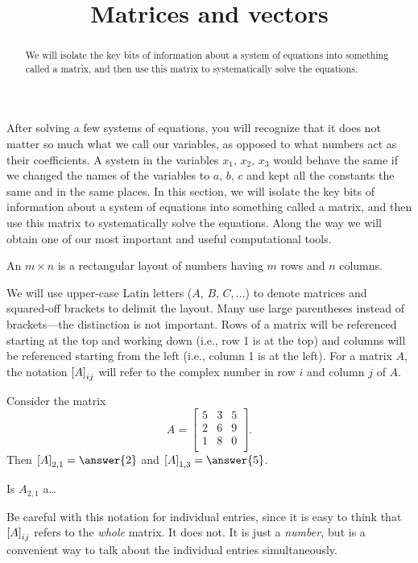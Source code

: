 \documentclass{ximera}
\title{Matrices and vectors}
\begin{document}
\begin{abstract}
  We will isolate the key bits of information about a system of
  equations into something called a matrix, and then use this matrix
  to systematically solve the equations.
\end{abstract}
\maketitle

After solving a few systems of equations, you will recognize that it does not matter so much what we call our variables, as opposed to what numbers act as their coefficients.  A system in the variables $x_1,\,x_2,\,x_3$  would behave the same if we changed the names of the variables to $a,\,b,\,c$ and kept all the constants the same and in the same places.  In this section, we will isolate the key bits of information about a system of equations into something called a matrix, and then use this matrix to systematically solve the equations.  Along the way we will obtain one of our most important and useful computational tools.

\begin{definition}
  An $m\times n$  is a rectangular layout of numbers having $m$ rows and $n$ columns.
\end{definition}

We will use upper-case Latin letters ($A,\,B,\,C,\dotsc$) to denote
matrices and squared-off brackets to delimit the layout.  Many use
large parentheses instead of brackets---the distinction is not
important.  Rows of a matrix will be referenced starting at the top
and working down (i.e., row 1 is at the top) and columns will be
referenced starting from the left (i.e., column 1 is at the left).
For a matrix $A$, the notation $\left\lbrack A\right\rbrack_{ij}$ will refer to the
complex number in row $i$ and column $j$ of $A$.

\begin{exercise}
  Consider the matrix
  \[
    A = \begin{bmatrix}
      5 & 3 & 5 \\
      2 & 6 & 9 \\
      1 & 8 & 0 \\
    \end{bmatrix}.
  \]
  Then $\matrixentry{A}{2,1} = \answer{2}$ and $\matrixentry{A}{1,3} = \answer{5}$.
\end{exercise}

\begin{question}
  Is $A_{2,1}$ a\ldots
  \begin{multipleChoice}
  \end{multipleChoice}
  
  \begin{feedback}
    Be careful with this notation for individual entries, since
    it is easy to think that $\left\lbrack A\right\rbrack_{ij}$ refers to the
    \emph{whole} matrix.  It does not.  It is just a
    \emph{number,} but is a convenient way to talk about the
    individual entries simultaneously.
  \end{feedback}
\end{question}
\end{document}
